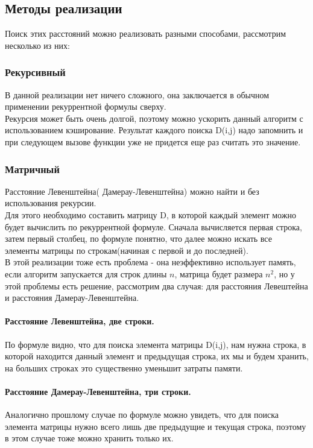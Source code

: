 \documentclass[12pt, a4paper]{article}
\begin{document}
\subsection{Методы реализации}
Поиск этих расстояний можно реализовать разными 
способами, рассмотрим несколько из них:
\subsubsection{Рекурсивный}
В данной реализации нет ничего сложного, она 
заключается в обычном применении рекуррентной 
формулы сверху.\\
Рекурсия может быть очень 
долгой, поэтому можно ускорить данный алгоритм с 
использованием кэширование. Результат каждого поиска 
D(i,j) надо запомнить и при следующем вызове 
функции уже не придется еще раз считать это 
значение.
\subsubsection{Матричный}
Расстояние Левенштейна( Дамерау-Левенштейна) 
можно найти и без использования рекурсии.\\
Для этого необходимо составить матрицу D, в которой 
каждый элемент можно будет вычислить по рекуррентной 
формуле. Сначала вычисляется первая строка, затем первый 
столбец, по формуле понятно, что далее можно искать 
все элементы матрицы по строкам(начиная с первой и 
до последней).\\
В этой реализации тоже есть проблема - она
неэффективно использует память, если алгоритм 
запускается для строк длины $n$, матрица будет
размера $n^2$, но у этой проблемы есть решение, 
рассмотрим два случая: для расстояния Левештейна 
и расстояния  Дамерау-Левенштейна.
\paragraph{Расстояние Левенштейна, две строки.}
По формуле видно, что для поиска элемента матрицы 
D(i,j), нам нужна строка, в которой находится 
данный элемент и предыдущая строка, их мы и 
будем хранить, на больших строках это 
существенно уменьшит затраты памяти.
\paragraph{Расстояние  Дамерау-Левенштейна, три 
строки.}
Аналогично прошлому случае по формуле можно увидеть, 
что для поиска элемента матрицы нужно всего лишь 
две предыдущие и текущая строка, поэтому в этом 
случае тоже можно хранить только их.
\newpage
\end{document}
